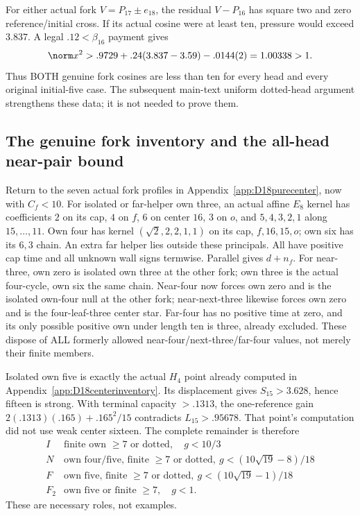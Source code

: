 For either actual fork \(V=P_{17}\pm e_{18}\), the residual
\(V-P_{16}\) has square two and zero reference/initial cross.
If its actual cosine were at least ten, pressure would exceed
\(3.837\). A legal \(.12<\beta_{16}\) payment gives
\[
 \norm x^2>.9729+.24(3.837-3.59)-.0144(2)
 =1.00338>1 .
\]
Thus BOTH genuine fork cosines are less than ten for every head
and every original initial-five case.
The subsequent main-text uniform dotted-head argument strengthens
these data; it is not needed to prove them.

\subsection{The genuine fork inventory and the all-head near-pair bound}
\label{app:D18forkinventory}
Return to the seven actual fork profiles in
Appendix~\ref{app:D18purecenter}, now with \(C_f<10\).
For isolated or far-helper own three, an actual affine \(E_8\)
kernel has coefficients \(2\) on its cap, \(4\) on \(f\),
\(6\) on center \(16\), \(3\) on \(o\), and
\(5,4,3,2,1\) along \(15,\ldots,11\).
Own four has kernel \((\sqrt2,2,2,1,1)\)
on its cap, \(f,16,15,o\); own six has its \(6,3\) chain.
An extra far helper lies outside these principals.
All have positive cap time and all unknown wall signs termwise.
Parallel gives \(d+n_f\).
For near-three, own zero is isolated own three at the other fork;
own three is the actual four-cycle, own six the same chain.
Near-four now forces own zero and is the isolated own-four null
at the other fork; near-next-three likewise forces own zero and
is the four-leaf-three center star.
Far-four has no positive time at zero, and its only possible
positive own under length ten is three, already excluded.
These dispose of ALL formerly allowed near-four/next-three/far-four
values, not merely their finite members.

Isolated own five is exactly the actual \(H_4\) point already
computed in Appendix~\ref{app:D18centerinventory}.
Its displacement gives \(S_{15}>3.628\), hence fifteen is strong.
With terminal capacity \(>.1313\), the one-reference gain
\(2(.1313)(.165)+.165^2/15\) contradicts \(L_{15}>.95678\).
That point's computation did not use weak center sixteen.
The complete remainder is therefore
\[
\begin{array}{c|c}
I&\text{finite own }\geq7\text{ or dotted},\quad g<10/3\\
N&\text{own four/five, finite }\geq7\text{ or dotted},\
 g<(10\sqrt{19}-8)/18\\
F&\text{own five, finite }\geq7\text{ or dotted},\
 g<(10\sqrt{19}-1)/18\\
F_2&\text{own five or finite }\geq7,\quad g<1 .
\end{array}
\]
These are necessary roles, not examples.

